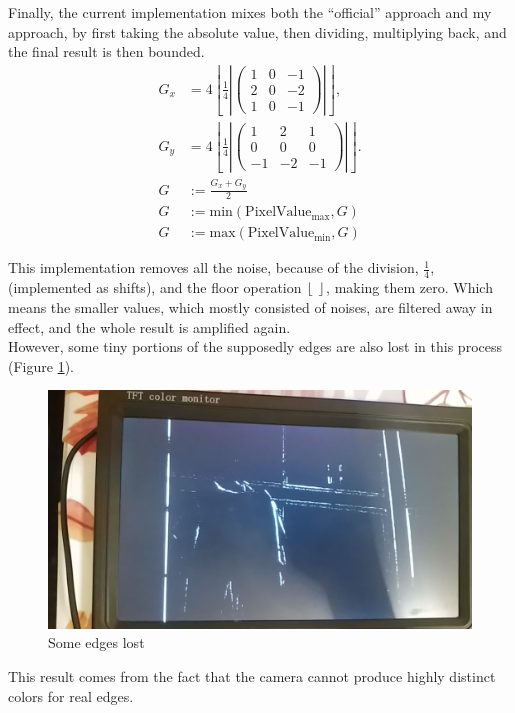 \documentclass{article}
\begin{document}
	Finally, the current implementation mixes both the ``official'' approach and my approach, by first taking the absolute value, then dividing, multiplying back, and the final result is then bounded.
	\begin{align*}
		G_x&=4\left\lfloor{ \frac{1}{4}\left |
		\begin{pmatrix}
			1&0&-1\\
			2&0&-2\\
			1&0&-1
		\end{pmatrix}\right|} \right\rfloor
		,\\
		G_y&=4\left\lfloor{ \frac{1}{4}\left |
		\begin{pmatrix}
			1&2&1\\
			0&0&0\\
			-1&-2&-1
		\end{pmatrix}\right|} \right\rfloor
		.\\
		G&:=\frac{G_x+G_y}{2}\\
		G&:=\text{min}(\text{PixelValue}_\text{max}, G)\\
		G&:=\text{max}(\text{PixelValue}_\text{min}, G)
	\end{align*}
	
	 This implementation removes all the noise, because of the division, $\frac{1}{4}$, (implemented as shifts), and the floor operation $\lfloor\hspace{1ex} \rfloor$, making them zero. Which means the smaller values, which mostly consisted of noises, are filtered away in effect, and the whole result is amplified again.
	\\
	 
	 However, some tiny portions of the supposedly edges are also lost in this process (Figure \ref{fig:real4}).
\begin{figure}[h]
		\centering
		\includegraphics[scale=0.15]{real4}
		\caption{Some edges lost}
		\label{fig:real4}
	\end{figure}This result comes from the fact that the camera cannot produce highly distinct colors for real edges.
	\\
	 
\end{document}
